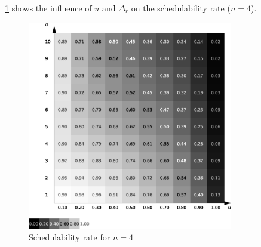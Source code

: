 \ref{fig:stu:4s} shows the influence of $u$ and $\Delta_r$ on the schedulability rate ($n = 4$).

\begin{figure}
	\centering
	\includegraphics[width=0.8\textwidth]{../mean/eps/4s}
	\caption{\label{fig:stu:4s} Schedulability rate for $n = 4$}
\end{figure}
